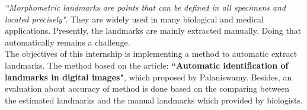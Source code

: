 \textit{``Morphometric landmarks are points that can be defined in all specimens  and located precisely"}\cite{palaniswamy2010automatic}. They are widely used in many biological and medical applications. Presently, the landmarks are mainly extracted manually. Doing that automatically remains a challenge.\\[0.2cm]
The objectives of this internship is implementing a method to automatic extract landmarks. The method based on the article: \textbf{``Automatic identification of landmarks in digital images"}, which proposed by Palaniswamy\cite{palaniswamy2010automatic}. Besides, an evaluation about accuracy of method is done based on the comparing between the estimated landmarks and the manual landmarks which provided by biologists.